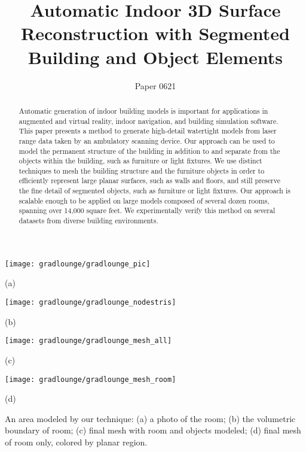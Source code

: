 \documentclass[review]{acmsiggraph}
\title{Automatic Indoor 3D Surface Reconstruction with Segmented Building and Object Elements}
\author{Paper 0621}
\begin{document}
\teaser
{
	\begin{minipage}[c]{0.24\linewidth}
		\centerline{\texttt{[image: gradlounge/gradlounge\_pic]}}
		\centerline{(a)}
	\end{minipage}
	\hfill
	\begin{minipage}[c]{0.24\linewidth}
		\centerline{\texttt{[image: gradlounge/gradlounge\_nodestris]}}
		\centerline{(b)}
	\end{minipage}
	\hfill
	\begin{minipage}[c]{0.24\linewidth}
		\centerline{\texttt{[image: gradlounge/gradlounge\_mesh\_all]}}
		\centerline{(c)}
	\end{minipage}
	\hfill
	\begin{minipage}[c]{0.24\linewidth}
		\centerline{\texttt{[image: gradlounge/gradlounge\_mesh\_room]}}
		\centerline{(d)}
	\end{minipage}
	\hfill

	\caption{An area modeled by our technique: (a) a photo of the room; (b) the volumetric boundary of room; (c) final mesh with room and objects modeled; (d) final mesh of room only, colored by planar region.}
	\label{fig:banner}
}

\maketitle

\begin{abstract}

Automatic generation of indoor building models is important for applications in augmented and virtual reality, indoor navigation, and building simulation software.  This paper presents a method to generate high-detail watertight models from laser range data taken by an ambulatory scanning device.  Our approach can be used to model the permanent structure of the building in addition to and separate from the objects within the building, such as furniture or light fixtures.  We use distinct techniques to mesh the building structure and the furniture objects in order to efficiently represent large planar surfaces, such as walls and floors, and still preserve the fine detail of segmented objects, such as furniture or light fixtures.  Our approach is scalable enough to be applied on large models composed of several dozen rooms, spanning over 14,000 square feet.  We experimentally verify this method on several datasets from diverse building environments.

\end{abstract}
\end{document}
